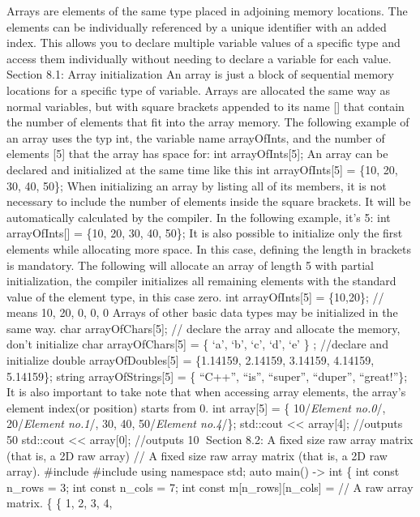 Arrays are elements of the same type placed in adjoining memory
locations. The elements can be individually referenced by a unique
identifier with an added index. This allows you to declare multiple
variable values of a specific type and access them individually without
needing to declare a variable for each value. Section 8.1: Array
initialization An array is just a block of sequential memory locations
for a specific type of variable. Arrays are allocated the same way as
normal variables, but with square brackets appended to its name {[}{]}
that contain the number of elements that fit into the array memory. The
following example of an array uses the typ int, the variable name
arrayOfInts, and the number of elements {[}5{]} that the array has space
for: int arrayOfInts{[}5{]}; An array can be declared and initialized at
the same time like this int arrayOfInts{[}5{]} = \{10, 20, 30, 40, 50\};
When initializing an array by listing all of its members, it is not
necessary to include the number of elements inside the square brackets.
It will be automatically calculated by the compiler. In the following
example, it's 5: int arrayOfInts{[}{]} = \{10, 20, 30, 40, 50\}; It is
also possible to initialize only the first elements while allocating more
space. In this case, defining the length in brackets is mandatory. The
following will allocate an array of length 5 with partial
initialization, the compiler initializes all remaining elements with the
standard value of the element type, in this case zero. int
arrayOfInts{[}5{]} = \{10,20\}; // means 10, 20, 0, 0, 0 Arrays of other
basic data types may be initialized in the same way. char
arrayOfChars{[}5{]}; // declare the array and allocate the memory, don't
initialize char arrayOfChars{[}5{]} = \{ `a', `b', `c', `d', `e' \} ;
//declare and initialize double arrayOfDoubles{[}5{]} = \{1.14159,
2.14159, 3.14159, 4.14159, 5.14159\}; string arrayOfStrings{[}5{]} = \{
``C++'', ``is'', ``super'', ``duper'', ``great!''\}; It is also
important to take note that when accessing array elements, the array's
element index(or position) starts from 0. int array{[}5{]} = \{
10/\emph{Element no.0}/, 20/\emph{Element no.1}/, 30, 40,
50/\emph{Element no.4}/\}; std::cout \textless\textless{} array{[}4{]};
//outputs 50 std::cout \textless\textless{} array{[}0{]}; //outputs 10
Section 8.2: A fixed size raw array matrix (that is, a 2D raw array) //
A fixed size raw array matrix (that is, a 2D raw array). \#include
\#include using namespace std; auto main() -\textgreater{} int \{ int
const n\_rows = 3; int const n\_cols = 7; int const
m{[}n\_rows{]}{[}n\_cols{]} = // A raw array matrix. \{ \{ 1, 2, 3, 4,
